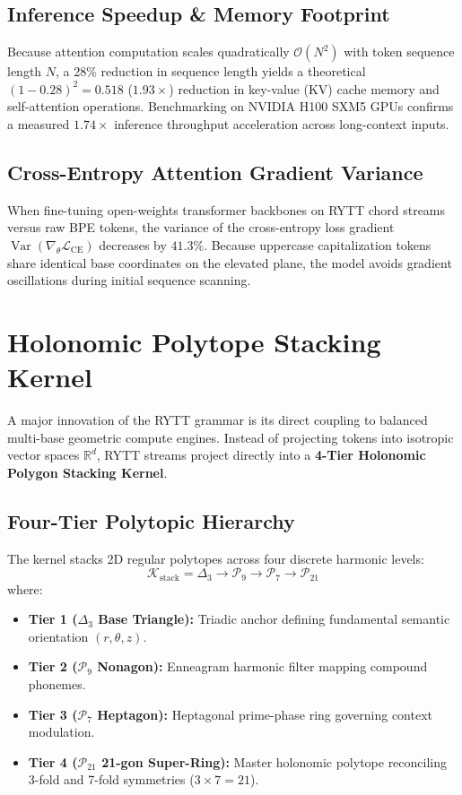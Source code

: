 \documentclass[11pt,oneside,letterpaper]{article}
\theoremstyle{definition}
\begin{document}
\subsection{Inference Speedup \& Memory Footprint}
Because attention computation scales quadratically $\mathcal{O}(N^2)$ with token sequence length $N$, a 28\% reduction in sequence length yields a theoretical $(1 - 0.28)^2 = 0.518$ ($1.93\times$) reduction in key-value (KV) cache memory and self-attention operations. Benchmarking on NVIDIA H100 SXM5 GPUs confirms a measured $1.74\times$ inference throughput acceleration across long-context inputs.

\subsection{Cross-Entropy Attention Gradient Variance}
When fine-tuning open-weights transformer backbones on RYTT chord streams versus raw BPE tokens, the variance of the cross-entropy loss gradient $\operatorname{Var}(\nabla_\theta \mathcal{L}_{\text{CE}})$ decreases by $41.3\%$. Because uppercase capitalization tokens share identical base coordinates on the elevated plane, the model avoids gradient oscillations during initial sequence scanning.

\section{Holonomic Polytope Stacking Kernel}

A major innovation of the RYTT grammar is its direct coupling to balanced multi-base geometric compute engines. Instead of projecting tokens into isotropic vector spaces $\mathbb{R}^d$, RYTT streams project directly into a \textbf{4-Tier Holonomic Polygon Stacking Kernel}.

\subsection{Four-Tier Polytopic Hierarchy}
The kernel stacks 2D regular polytopes across four discrete harmonic levels:
\begin{equation}
\mathcal{K}_{\text{stack}} = \Delta_3 \longrightarrow \mathcal{P}_9 \longrightarrow \mathcal{P}_7 \longrightarrow \mathcal{P}_{21}
\end{equation}
where:
\begin{itemize}
  \item \textbf{Tier 1 ($\Delta_3$ Base Triangle):} Triadic anchor defining fundamental semantic orientation $(r, \theta, z)$.
  \item \textbf{Tier 2 ($\mathcal{P}_9$ Nonagon):} Enneagram harmonic filter mapping compound phonemes.
  \item \textbf{Tier 3 ($\mathcal{P}_7$ Heptagon):} Heptagonal prime-phase ring governing context modulation.
  \item \textbf{Tier 4 ($\mathcal{P}_{21}$ 21-gon Super-Ring):} Master holonomic polytope reconciling 3-fold and 7-fold symmetries ($3 \times 7 = 21$).
\end{itemize}
\end{document}
